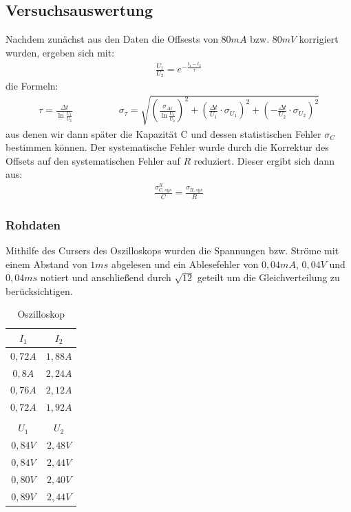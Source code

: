 \documentclass[12pt,a4paper]{article}
\begin{document}
\subsection{Versuchsauswertung}
Nachdem zunächst aus den Daten die Offsests von $80mA$ bzw. $80mV$ korrigiert wurden, ergeben sich mit:
\begin{align*}
\frac{U_1}{U_2}=e^{-\frac{t_1-t_2}{\tau}}
\end{align*}
die Formeln:
\begin{align*}
\tau=\frac{\Delta t}{\ln{\frac{U_1}{U_2}}} \hspace{2cm}
\sigma_{\tau}=\sqrt{(\frac{\sigma_{\Delta t}}{\ln{\frac{U_1}{U_2}}})^2+(\frac{\Delta t}{U_1} \cdot \sigma_{U_1})^2+(-\frac{\Delta t}{U_2} \cdot \sigma_{U_2})^2}
\end{align*}
aus denen wir dann später die Kapazität C und dessen statistischen Fehler $\sigma_C$ bestimmen können.
Der systematische Fehler wurde durch die Korrektur des Offsets auf den systematischen Fehler auf $R$ reduziert. Dieser ergibt sich dann aus:
\begin{align*}
\frac{\sigma_{C,sys}^R}{C}=\frac{\sigma_{R,sys}}{R}
\end{align*}
\subsubsection{Rohdaten}
Mithilfe des Cursers des Oszilloskops wurden die Spannungen bzw. Ströme mit einem Abstand von $1ms$ abgelesen und ein Ablesefehler von $0,04mA$,      \hspace{1mm} $0,04V$ und $0,04ms$ notiert und anschließend durch $\sqrt{12}$ geteilt um die Gleichverteilung zu berücksichtigen.
\begin{table}[H]\centering
\caption{Oszilloskop}
\begin{tabular}{c|c}
$I_1$& $I_2$\\ \hline
$0,72A$& $1,88A$\\ 
$0,8A$& $2,24A$ \\
$0,76A$& $2,12A$ \\
$0,72A$& $1,92A$ \\
\\
$U_1$& $U_2$ \\ \hline
$0,84V$& $2,48V$ \\
$0,84V$& $2,44V$ \\
$0,80V$& $2,40V$ \\
$0,89V$& $2,44V$ \\
\end{tabular} 
\end{table}
\end{document}

